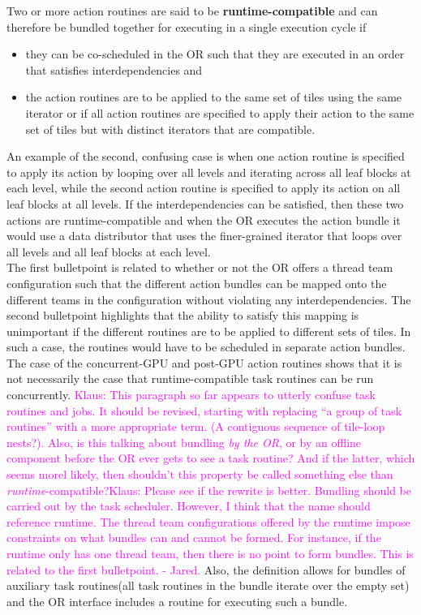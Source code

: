\documentclass{article}
\newcommand{\Klaus}[1]          {\textcolor{magenta}{Klaus: #1}}
\newcommand{\KlausRfromJO}[1]   {\textcolor{magenta}{Klaus: #1 - Jared.}}
\newcommand{\shortOR}   {OR\xspace}
\newcommand{\OR}        {\shortOR}
\newcommand{\tileloopnests}          {tile-loop nests\xspace}  %
\newcommand{\taskroutine}        {task routine\xspace}
\newcommand{\taskroutines}       {task routines\xspace}
\begin{document}
Two or more action routines are said to be \textbf{runtime-compatible} and can therefore be
bundled together for executing in a single execution cycle if
\begin{itemize}
\item{they can be co-scheduled in the \OR such that they are executed in an
order that satisfies interdependencies and}
\item{the action routines are to be applied to the same set of tiles using the
same iterator or if all action routines are specified to apply their action to the same set of tiles but
with distinct iterators that are compatible.}
\end{itemize}
An example of the second, confusing case is when one action routine
is specified to apply its action by looping over all levels and iterating across
all leaf blocks at each level, while the second action routine is specified to
apply its action on all leaf blocks at all levels.  If the interdependencies can be
satisfied, then these two actions are runtime-compatible and when the \OR
executes the action bundle it would use a data distributor that uses the
finer-grained iterator that loops over all levels and all leaf blocks at each
level.\\

The first bulletpoint is related to whether or not the \OR offers a thread team
configuration such that the different action bundles can be mapped onto the
different teams in the configuration without violating any interdependencies.
The second bulletpoint highlights that the ability to satisfy this mapping is
unimportant if the different routines are to be applied to different sets of
tiles.  In such a case, the routines would have to be scheduled in separate
action bundles.  The case of the concurrent-GPU and post-GPU action routines
shows that it is not necessarily the case that
runtime-compatible \taskroutines can be run concurrently.
\Klaus{This paragraph so far appears to utterly confuse \taskroutines and jobs.
It should be revised, starting with replacing ``a group of \taskroutines'' with
a more appropriate term. (A contiguous sequence of \tileloopnests?).
Also, is this talking about bundling \emph{by the \OR}, or by an offline
component before the \OR ever gets to see a \taskroutine?
And if the latter, which seems morel likely, then shouldn't this property
be called something else than \emph{runtime}-compatible?}\KlausRfromJO{Please
see if the rewrite is better.  Bundling
should be carried out by the task scheduler.  However, I think
that the name should reference runtime.  The thread team configurations offered
by the runtime impose constraints on what bundles can and cannot be formed.  For
instance, if the runtime only has one thread team, then there is no point to
form bundles.  This is related to the first bulletpoint.}
  Also, the definition allows
for bundles of auxiliary \taskroutines (all \taskroutines in the bundle iterate over the
empty set) and the \OR interface includes a routine for executing such a
bundle.\\
\end{document}
